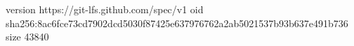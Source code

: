 version https://git-lfs.github.com/spec/v1
oid sha256:8ac6fce73cd7902dcd5030f87425e637976762a2ab5021537b93b637e491b736
size 43840
